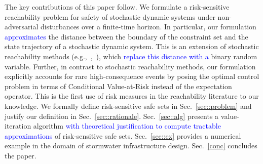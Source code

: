 \documentclass[letterpaper, 10 pt, conference]{ieeeconf}  %
\begin{document}
The key contributions of this paper follow.
We formulate a risk-sensitive reachability problem for safety of stochastic dynamic systems under non-adversarial disturbances
over a finite-time horizon. In particular, our formulation \textcolor{blue}{approximates} the distance between the boundary of the constraint set and the
state trajectory of a stochastic dynamic system. This is an extension of stochastic 
reachability methods (e.g.,~\cite{abate2008probabilistic},~\cite{summers2010verification}), which \textcolor{blue}{replace this distance with a} binary random variable.
Further, in contrast to stochastic reachability methods, our formulation explicitly accounts for rare high-consequence events by posing the optimal control problem
in terms of Conditional Value-at-Risk instead of the expectation operator. This is the first use of risk measures in the reachability literature to our knowledge.
We formally define risk-sensitive safe sets in Sec.~\ref{sec::problem} and justify our definition in Sec.~\ref{sec::rationale}.
Sec.~\ref{sec::alg} presents a value-iteration algorithm \textcolor{blue}{with theoretical justification to compute tractable approximations} of risk-sensitive safe sets.
Sec.~\ref{sec::ex} provides a numerical example in the domain of stormwater infrastructure design. Sec.~\ref{conc} concludes the paper.

\end{document}
